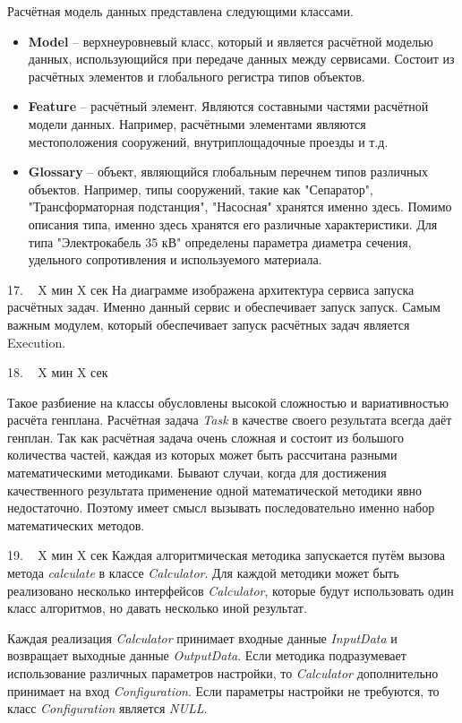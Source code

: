 \documentclass[a4paper,14pt]{extarticle}
\begin{document}
    Расчётная модель данных представлена следующими классами.
    \begin{itemize}
        \item \textbf{Model} -- верхнеуровневый класс, который и является расчётной моделью данных, использующийся
        при передаче данных между сервисами. Состоит из расчётных элементов и глобального регистра типов объектов.
        \item {
            \textbf{Feature} -- расчётный элемент. Являются составными частями расчётной модели данных. Например, расчётными
            элементами являются местоположения сооружений, внутриплощадочные проезды и т.д.
        }
        \item {
            \textbf{Glossary} -- объект, являющийся глобальным перечнем типов различных объектов.
            Например, типы сооружений, такие как "Сепаратор", "Трансформаторная подстанция", "Насосная" хранятся именно
            здесь. Помимо описания типа, именно здесь хранятся его различные характеристики. Для типа "Электрокабель 35 кВ"
            определены параметра диаметра сечения, удельного сопротивления и используемого материала.
        }
    \end{itemize}


    17. ~ X мин X сек
    На диаграмме изображена архитектура сервиса запуска расчётных задач.
    Именно данный сервис и обеспечивает запуск запуск.
    Самым важным модулем, который обеспечивает запуск расчётных задач является Execution.

    18. ~ X мин X сек

    Такое разбиение на классы обусловлены высокой сложностью и вариативностью расчёта генплана.
    Расчётная задача \textit{Task} в качестве своего результата всегда даёт генплан.
    Так как расчётная задача очень сложная и состоит из большого количества частей,
    каждая из которых может быть рассчитана разными математическими методиками.
    Бывают случаи, когда для достижения качественного результата применение одной математической методики
    явно недостаточно. Поэтому имеет смысл вызывать последовательно именно набор математических методов.

    19. ~ X мин X сек
    Каждая алгоритмическая методика запускается путём вызова метода \textit{calculate}
    в классе \textit{Calculator}.
    Для каждой методики может быть реализовано несколько интерфейсов \textit{Calculator},
    которые будут использовать один класс алгоритмов, но давать несколько иной результат.

    Каждая реализация \textit{Calculator} принимает входные данные \textit{InputData}
    и возвращает выходные данные \textit{OutputData}.
    Если методика подразумевает использование различных параметров настройки, то \textit{Calculator} дополнительно
    принимает на вход \textit{Configuration}. Если параметры настройки не требуются, то класс \textit{Configuration}
    является \textit{NULL}.
\end{document}
